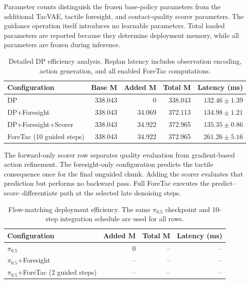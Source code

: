 \documentclass[10pt,letterpaper]{article}
\newcommand{\tabstyle}{\small\setlength{\tabcolsep}{3pt}\renewcommand{\arraystretch}{1.15}}
\begin{document}
Parameter counts distinguish the frozen base-policy parameters from the
additional TacVAE, tactile foresight, and contact-quality scorer parameters.
The guidance operation itself introduces no learnable parameters. Total loaded
parameters are reported because they determine deployment memory, while all
parameters are frozen during inference.

\begin{table}[H]
\caption{Detailed DP efficiency analysis. Replan latency includes observation
encoding, action generation, and all enabled ForeTac computations.}
\label{tab:dp_efficiency_appendix}
\centering
\tabstyle
\begin{tabular}{lrrrr}
\toprule
Configuration & Base M & Added M & Total M & Latency (ms)\\
\midrule
DP & 338.043 & 0 & 338.043 & $132.46 \pm 1.39$\\
DP+Foresight & 338.043 & 34.069 & 372.113 & $134.98 \pm 1.21$\\
DP+Foresight+Scorer & 338.043 & 34.922 & 372.965 & $135.35 \pm 0.86$\\
ForeTac (10 guided steps) & 338.043 & 34.922 & 372.965 & $261.26 \pm 5.16$\\
\bottomrule
\end{tabular}
\end{table}

The forward-only scorer row separates quality evaluation from gradient-based
action refinement. The foresight-only configuration predicts the tactile
consequence once for the final unguided chunk. Adding the scorer evaluates that
prediction but performs no backward pass. Full ForeTac executes the
predict--score--differentiate path at the selected late denoising steps.

\begin{table}[H]
\caption{Flow-matching deployment efficiency. The same $\pi_{0.5}$ checkpoint
and 10-step integration schedule are used for all rows.}
\label{tab:pi05_efficiency_appendix}
\centering
\tabstyle
\begin{tabular}{lrrr}
\toprule
Configuration & Added M & Total M & Latency (ms)\\
\midrule
$\pi_{0.5}$ & 0 & -- & --\\
$\pi_{0.5}$+Foresight & -- & -- & --\\
$\pi_{0.5}$+ForeTac (2 guided steps) & -- & -- & --\\
\bottomrule
\end{tabular}
\end{table}
\end{document}
